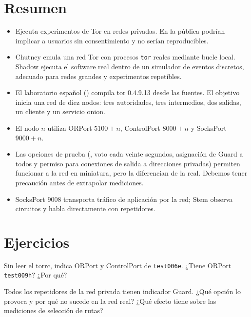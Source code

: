 \section*{Resumen}
\begin{itemize}
  \item Ejecuta experimentos de Tor en redes privadas. En la pública podrían implicar a usuarios sin consentimiento y no serían reproducibles.
  \item Chutney emula una red Tor con procesos \texttt{tor} reales mediante bucle local. Shadow ejecuta el software real dentro de un simulador de eventos discretos, adecuado para redes grandes y experimentos repetibles.
  \item El laboratorio español () compila tor 0.4.9.13 desde las fuentes. El objetivo  inicia una red de diez nodos: tres autoridades, tres intermedios, dos salidas, un cliente y un servicio onion.
  \item El nodo $n$ utiliza ORPort $5100+n$, ControlPort $8000+n$ y SocksPort $9000+n$.
  \item Las opciones de prueba (, voto cada veinte segundos, asignación de Guard a todos y permiso para conexiones de salida a direcciones privadas) permiten funcionar a la red en miniatura, pero la diferencian de la real. Debemos tener precaución antes de extrapolar mediciones.
  \item SocksPort 9008 transporta tráfico de aplicación por la red; Stem observa circuitos y  habla directamente con repetidores.
\end{itemize}

\section*{Ejercicios}

\begin{esercizio}[1]\label{es:19-porte}
Sin leer el torrc, indica ORPort y ControlPort de \texttt{test006e}. ¿Tiene ORPort \texttt{test009h}? ¿Por qué?
\end{esercizio}

\begin{esercizio}[1]\label{es:19-guard}
Todos los repetidores de la red privada tienen indicador Guard. ¿Qué opción lo provoca y por qué no sucede en la red real? ¿Qué efecto tiene sobre las mediciones de selección de rutas?
\end{esercizio}

